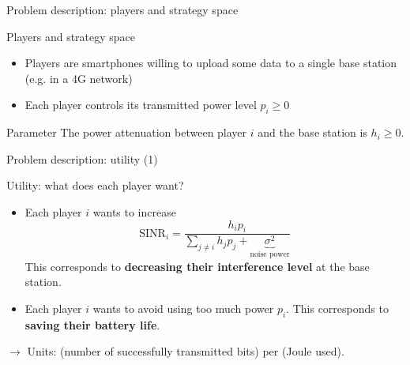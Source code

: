 \begin{frame}{Problem description: players and strategy space}
    \begin{exampleblock}{Players and strategy space}
        \begin{itemize}
            \pause
            \item Players are smartphones willing to upload some data to a single base station (e.g. in
            a 4G network)
            \pause
            \item Each player controls its transmitted power level $p_i \ge 0$
        \end{itemize}
    \end{exampleblock}

    \vspace{0.5cm}
    \pause
    \begin{block}{Parameter}
        The power attenuation between player $i$ and the base station is $h_i \ge 0$.
    \end{block}
\end{frame}


\begin{frame}{Problem description: utility (1)}
    \begin{exampleblock}{Utility: what does each player want?}
        \begin{itemize}
            \pause
            \item Each player $i$ wants to increase
            \[ \text{SINR}_i = \frac{h_ip_i}{\sum_{j\neq i} h_jp_j 
                + \underbrace{\sigma^2}_\text{noise power}} \]
            This corresponds to \textbf{decreasing their interference level} at the base station.
            \pause
            \item Each player $i$ wants to avoid using too much power $p_i$. This corresponds
            to \textbf{saving their battery life}.
        \end{itemize}
    \end{exampleblock}

    \pause
    \vspace{0.5cm}
    $\to$ Units: (number of successfully transmitted bits) per (Joule used).
\end{frame}

